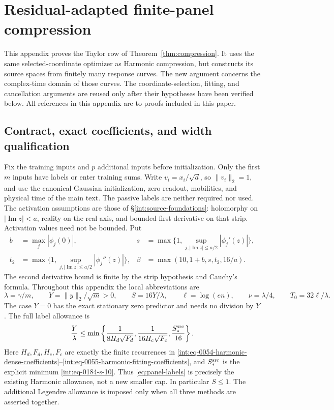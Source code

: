 \section{Residual-adapted finite-panel compression}
\label{sec:panel-proof}

This appendix proves the Taylor row of Theorem~\ref{thm:compression}.
It uses the same selected-coordinate optimizer as Harmonic compression,
but constructs its source spaces from finitely many response curves.
The new argument concerns the complex-time domain of those curves.
The coordinate-selection, fitting, and cancellation arguments are reused
only after their hypotheses have been verified below.  All references in
this appendix are to proofs included in this paper.

\subsection{Contract, exact coefficients, and width qualification}
\label{sec:panel-contract}

Fix the training inputs and \(p\) additional inputs before initialization.
Only the first \(m\) inputs have labels or enter training sums.  Write
\(v_i=x_i/\sqrt d\), so \(\|v_i\|_2=1\), and use the canonical
Gaussian initialization, zero readout, mobilities, and physical time of
the main text.  The passive labels are neither required nor used.  The
activation assumptions are those of
\S\ref{int:source-foundations}: holomorphy on \(|\operatorname{Im}z|<a\),
reality on the real axis, and bounded first derivative on that strip.
Activation values need not be bounded.  Put
\begin{align*}
 b&=\max_j|\phi_j(0)|,&
 s&=\max\{1,\sup_{j,|\operatorname{Im}z|\le a/2}|\phi_j'(z)|\},\\
 t_2&=\max\{1,\sup_{j,|\operatorname{Im}z|\le a/2}|\phi_j''(z)|\},&
 \beta&=\max(10,1+b,s,t_2,16/a).
\end{align*}
The second derivative bound is finite by the strip hypothesis and
Cauchy's formula.  Throughout this appendix the local abbreviations are
\[
 \lambda=\gamma/m,\qquad Y=\|y\|_2/\sqrt m>0,\qquad
 S=16Y/\lambda,\qquad \ell=\log(en),\qquad
 \nu=\lambda/4,\qquad T_0=32\ell/\lambda.
\]
The case \(Y=0\) has the exact stationary zero predictor and needs no
division by \(Y\).  The full label allowance is
\begin{equation}
 \frac{Y}{\lambda}\le
 \min\left\{\frac1{8H_d\sqrt{F_d}},
             \frac1{16H_c\sqrt{F_c}},\frac{S_*^{\rm src}}{16}\right\}.
 \label{eq:panel-labels}
\end{equation}
Here \(H_d,F_d,H_c,F_c\) are exactly the finite recurrences in
\eqref{int:eq-0054-harmonic-dense-coefficients}--\eqref{int:eq-0055-harmonic-fitting-coefficients},
and \(S_*^{\rm src}\) is the explicit minimum
\eqref{int:eq-0184-s-10}.  Thus \eqref{eq:panel-labels} is precisely
the existing Harmonic allowance, not a new smaller cap.  In particular
\(S\le1\).  The additional Legendre allowance is imposed only when
all three methods are asserted together.

